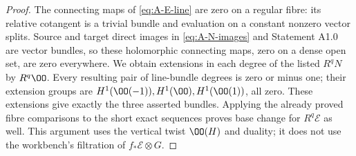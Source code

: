 \begin{proof}
The connecting maps of \eqref{eq:A-E-line} are zero on a regular
fibre: its relative cotangent is a trivial bundle and evaluation on
a constant nonzero vector splits.  Source and target direct images
in \eqref{eq:A-N-images} and Statement A1.0 are vector bundles,
so these holomorphic connecting maps, zero on a dense open set, are
zero everywhere.  We obtain extensions in each degree of the listed
$R^qN$ by $R^q\OO$.  Every resulting pair of line-bundle degrees is
zero or minus one; their extension groups are
$H^1(\OO(-1)),H^1(\OO),H^1(\OO(1))$, all zero.  These extensions
give exactly the three asserted bundles.  Applying the already proved
fibre comparisons to the short exact sequences proves base change
for $R^q\mathcal E$ as well.  This argument uses the vertical twist
$\OO(H)$ and duality; it does not use the workbench's filtration of
$f_*\mathcal E\otimes G$.
\end{proof}
